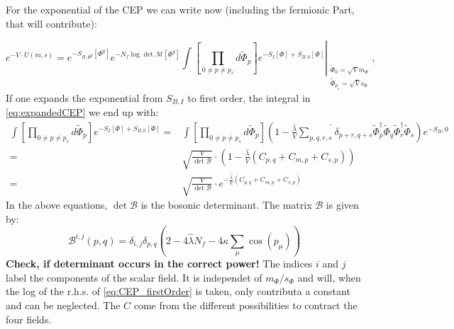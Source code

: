 For the exponential of the CEP we can write now (including the fermionic Part, that will contribute):

\begin{equation} \label{eq:expandedCEP}
 e^{-V\cdot U(m,s)} = e^{-S_{B,\Phi^g}[\Phi^g]} e^{-N_f \log \det \mathcal{M}[\Phi^g]} 
                      \int \left. \left[\prod\limits_{0 \neq p \neq p_s}  d \tilde \Phi_p \right]   
                      e^{-S_{I}[\Phi] +  S_{B,0}[\Phi]}
                       \right|_{ \begin{array}{l} \scriptscriptstyle \tilde \Phi_0=\sqrt{V} m_{\Phi} \\ 
                                     \scriptscriptstyle \tilde \Phi_{p_s}=\sqrt{V}s_{\Phi} \end{array}},
\end{equation}
If one expands the exponential from $S_{B,I}$ to first order, the integral in \eqref{eq:expandedCEP} we end up with:
\begin{align}\label{eq:CEP_firstOrder}
 \int \left[ \prod\limits_{0 \neq p \neq p_s}  d \tilde \Phi_p \right]   
                      e^{-S_{I}[\Phi] +  S_{B,0}[\Phi]} =& \int \left[ \prod\limits_{0 \neq p \neq p_s}  d \tilde \Phi_p \right] 
                      \left( 1 - \frac{\hat\lambda}{V} \hat{\sum\limits_{p,q,r,s}}\delta_{p+r,q+s} 
                      \tilde\Phi_p^{\dagger} \tilde\Phi_q \tilde\Phi_r^{\dagger} \tilde\Phi_s \right)e^{-S_B,0} \nonumber \\
                      =& \sqrt{\frac{V}{\det \mathcal{B}}} \cdot \left(1 - \frac{\hat\lambda}{V} \left( C_{p,q} + C_{m,p} + C_{s,p} \right) \right) \nonumber \\
                      =& \sqrt{\frac{V}{\det \mathcal{B}}} \cdot e^{-\frac{\hat\lambda}{V} \left( C_{p,q} + C_{m,p} + C_{s,p} \right)}
\end{align}
In the above equations, $\det\mathcal{B}$ is the bosonic determinant. The matrix $\mathcal{B}$ is given by:
\begin{equation}\label{eq:def_BosonicDeterminant}
\mathcal{B}^{i,j}(p,q)=\delta_{i,j}\delta_{p,q} \left( 2 - 4 \hat\lambda N_f - 4 \kappa \sum\limits_{\mu} \cos(p_{\mu}) \right)
\end{equation}
\textbf{Check, if determinant occurs in the correct power!}
The indices $i$ and $j$ label the components of the scalar field. It is independet of $m_{\Phi}/s_{\Phi}$ and will, 
when the log of the r.h.s. of \eqref{eq:CEP_firstOrder} is taken, only contributa a constant and can be neglected.
The $C$ come from the different possibilities to contract the four fields. 
